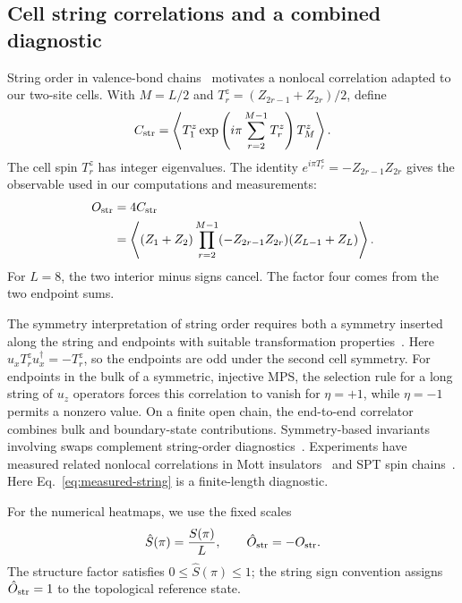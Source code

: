 \subsection{Cell string correlations and a combined diagnostic}
\label{sec:heatmaps}

String order in valence-bond chains~\cite{dennijs1989preroughening} motivates a nonlocal correlation adapted to our two-site cells.
With $M=L/2$ and $T_r^z=(Z_{2r-1}+Z_{2r})/2$, define
\begin{equation}
C_{\rm str}=
\left\langle T_1^z
\exp\left(i\pi\sum_{r=2}^{M-1}T_r^z\right)T_M^z\right\rangle.
\label{eq:cell-string}
\end{equation}
The cell spin $T_r^z$ has integer eigenvalues.
The identity $e^{i\pi T_r^z}=-Z_{2r-1}Z_{2r}$ gives the observable used in our computations and measurements:
\begin{align}
O_{\rm str}&=4C_{\rm str}\nonumber\\
&=\left\langle (Z_1+Z_2)
\prod_{r=2}^{M-1}(-Z_{2r-1}Z_{2r})
(Z_{L-1}+Z_L)\right\rangle.
\label{eq:measured-string}
\end{align}
For $L=8$, the two interior minus signs cancel.
The factor four comes from the two endpoint sums.

The symmetry interpretation of string order requires both a symmetry inserted along the string and endpoints with suitable transformation properties~\cite{perezgarcia2008string,pollmann2012detection}.
Here $u_xT_r^zu_x^\dagger=-T_r^z$, so the endpoints are odd under the second cell symmetry. For endpoints in the bulk of a symmetric, injective MPS, the selection rule for a long string of $u_z$ operators forces this correlation to vanish for $\eta=+1$, while $\eta=-1$ permits a nonzero value. On a finite open chain, the end-to-end correlator combines bulk and boundary-state contributions.
Symmetry-based invariants involving swaps complement string-order diagnostics~\cite{haegeman2012order}.
Experiments have measured related nonlocal correlations in Mott insulators~\cite{endres2011observation} and SPT spin chains~\cite{tan2023realizing}.
Here Eq.~\eqref{eq:measured-string} is a finite-length diagnostic.

For the numerical heatmaps, we use the fixed scales
\begin{equation}
\hat S(\pi)=\frac{S(\pi)}{L},\qquad
\hat O_{\rm str}=-O_{\rm str}.
\label{eq:fixed-scales}
\end{equation}
The structure factor satisfies $0\leq\hat S(\pi)\leq1$; the string sign convention assigns $\hat O_{\rm str}=1$ to the topological reference state.

